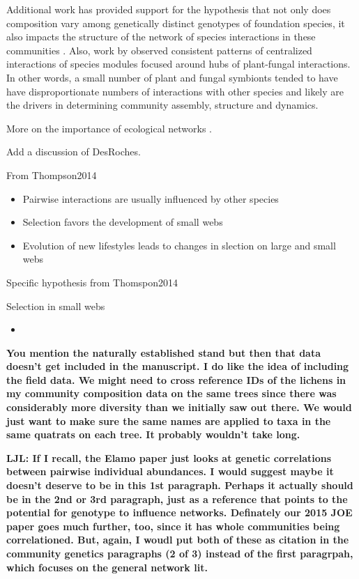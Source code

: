 \documentclass[9pt,twocolumn,twoside,lineno]{pnas-new}
\begin{document}
Additional work has provided support for the hypothesis that not only
does composition vary among genetically distinct genotypes of
foundation species, it also impacts the structure of the network of
species interactions in these communities \cite{Keith2017,
  Lau2015a}. Also, work by \citep{Toju2017, Toju2016, Toju2014a}
observed consistent patterns of centralized interactions of species
modules focused around hubs of plant-fungal interactions. In other
words, a small number of plant and fungal symbionts tended to have
have disproportionate numbers of interactions with other species and
likely are the drivers in determining community assembly, structure
and dynamics.


More on the importance of ecological networks \cite{Guimaraes2011,
  Thompson2013a}.

Add a discussion of DesRoches.

From Thompson2014

\begin{itemize}
\item Pairwise interactions are usually influenced by other species
\item Selection favors the development of small webs
\item Evolution of new lifestyles leads to changes in slection on
  large and small webs
\end{itemize}

Specific hypothesis from Thomspon2014

Selection in small webs

\begin{itemize}
\item 
\end{itemize}

\textbf{You mention the naturally established stand but then that data
  doesn’t get included in the manuscript. I do like the idea of
  including the field data. We might need to cross reference IDs of
  the lichens in my community composition data on the same trees since
  there was considerably more diversity than we initially saw out
  there. We would just want to make sure the same names are applied to
  taxa in the same quatrats on each tree. It probably wouldn’t take
  long.}

\textbf{LJL: If I recall, the Elamo paper just looks at genetic
  correlations between pairwise individual abundances. I would suggest
  maybe it doesn’t deserve to be in this 1st paragraph. Perhaps it
  actually should be in the 2nd or 3rd paragraph, just as a reference
  that points to the potential for genotype to influence
  networks. Definately our 2015 JOE paper goes much further, too,
  since it has whole communities being correlationed. But, again, I
  woudl put both of these as citation in the community genetics
  paragraphs (2 of 3) instead of the first paragrpah, which focuses on
  the general network lit.}
\end{document}
